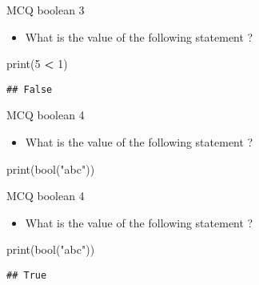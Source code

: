 \documentclass[
  8pt,
  ignorenonframetext,
]{beamer}
\newenvironment{Shaded}{\begin{snugshade}}{\end{snugshade}}
\newcommand{\BuiltInTok}[1]{#1}
\newcommand{\DecValTok}[1]{\textcolor[rgb]{0.00,0.00,0.81}{#1}}
\newcommand{\NormalTok}[1]{#1}
\newcommand{\OperatorTok}[1]{\textcolor[rgb]{0.81,0.36,0.00}{\textbf{#1}}}
\newcommand{\StringTok}[1]{\textcolor[rgb]{0.31,0.60,0.02}{#1}}
\providecommand{\tightlist}{%
  \setlength{\itemsep}{0pt}\setlength{\parskip}{0pt}}
\begin{document}
\begin{frame}[fragile]{MCQ boolean 3}
\protect\hypertarget{mcq-boolean-3-1}{}
\begin{itemize}
\tightlist
\item
  What is the value of the following statement ?
\end{itemize}

\begin{Shaded}
\begin{Highlighting}[]
\BuiltInTok{print}\NormalTok{(}\DecValTok{5} \OperatorTok{\textless{}} \DecValTok{1}\NormalTok{)}
\end{Highlighting}
\end{Shaded}

\begin{verbatim}
## False
\end{verbatim}
\end{frame}

\begin{frame}[fragile]{MCQ boolean 4}
\protect\hypertarget{mcq-boolean-4}{}
\begin{itemize}
\tightlist
\item
  What is the value of the following statement ?
\end{itemize}

\begin{Shaded}
\begin{Highlighting}[]
\BuiltInTok{print}\NormalTok{(}\BuiltInTok{bool}\NormalTok{(}\StringTok{"abc"}\NormalTok{))}
\end{Highlighting}
\end{Shaded}
\end{frame}

\begin{frame}[fragile]{MCQ boolean 4}
\protect\hypertarget{mcq-boolean-4-1}{}
\begin{itemize}
\tightlist
\item
  What is the value of the following statement ?
\end{itemize}

\begin{Shaded}
\begin{Highlighting}[]
\BuiltInTok{print}\NormalTok{(}\BuiltInTok{bool}\NormalTok{(}\StringTok{"abc"}\NormalTok{))}
\end{Highlighting}
\end{Shaded}

\begin{verbatim}
## True
\end{verbatim}
\end{frame}
\end{document}
